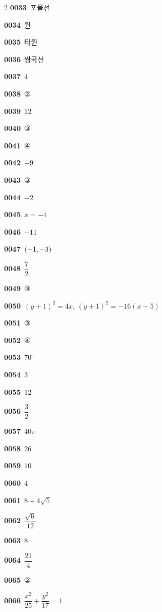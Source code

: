 \documentclass[10pt,a4paper]{article}
\begin{document}
\begin{multicols}{2}
\noindent\textbf{0033}\ 포물선\par
\noindent\textbf{0034}\ 원\par
\noindent\textbf{0035}\ 타원\par
\noindent\textbf{0036}\ 쌍곡선\par
\noindent\textbf{0037}\ $4$\par
\noindent\textbf{0038}\ ②\par
\noindent\textbf{0039}\ $12$\par
\noindent\textbf{0040}\ ③\par
\noindent\textbf{0041}\ ④\par
\noindent\textbf{0042}\ $-9$\par
\noindent\textbf{0043}\ ③\par
\noindent\textbf{0044}\ $-2$\par
\noindent\textbf{0045}\ $x=-4$\par
\noindent\textbf{0046}\ $-11$\par
\noindent\textbf{0047}\ $(-1{,}\mkern3mu\mathopen{}-3)$\par
\noindent\textbf{0048}\ $\dfrac{7}{2}$\par
\noindent\textbf{0049}\ ③\par
\noindent\textbf{0050}\ $(y+1)^2=4x$, $(y+1)^2=-16(x-5)$\par
\noindent\textbf{0051}\ ③\par
\noindent\textbf{0052}\ ④\par
\noindent\textbf{0053}\ $70^\circ$\par
\noindent\textbf{0054}\ $3$\par
\noindent\textbf{0055}\ $12$\par
\noindent\textbf{0056}\ $\dfrac{3}{2}$\par
\noindent\textbf{0057}\ $40\pi$\par
\noindent\textbf{0058}\ $26$\par
\noindent\textbf{0059}\ $10$\par
\noindent\textbf{0060}\ $4$\par
\noindent\textbf{0061}\ $8+4\sqrt{5}$\par
\noindent\textbf{0062}\ $\dfrac{\sqrt{6}}{12}$\par
\noindent\textbf{0063}\ $8$\par
\noindent\textbf{0064}\ $\dfrac{21}{4}$\par
\noindent\textbf{0065}\ ②\par
\noindent\textbf{0066}\ $\dfrac{x^2}{25}+\dfrac{y^2}{17}=1$\par

\end{multicols}
\end{document}
